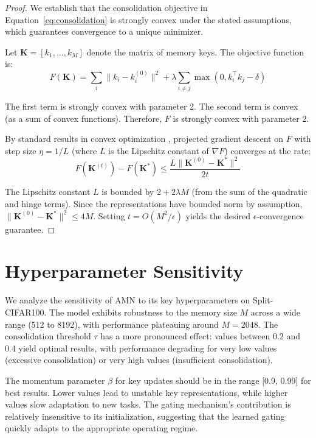 \documentclass[11pt]{article}
\begin{document}
\begin{proof}
We establish that the consolidation objective in Equation~\ref{eq:consolidation} is strongly convex under the stated assumptions, which guarantees convergence to a unique minimizer.

Let $\mathbf{K} = [k_1, \ldots, k_M]$ denote the matrix of memory keys. The objective function is:
\begin{equation}
    F(\mathbf{K}) = \sum_{i} \|k_i - k_i^{(0)}\|^2 + \lambda \sum_{i \neq j} \max(0, k_i^\top k_j - \delta)
\end{equation}

The first term is strongly convex with parameter 2. The second term is convex (as a sum of convex functions). Therefore, $F$ is strongly convex with parameter 2.

By standard results in convex optimization \citep{boyd2004convex}, projected gradient descent on $F$ with step size $\eta = 1/L$ (where $L$ is the Lipschitz constant of $\nabla F$) converges at the rate:
\begin{equation}
    F(\mathbf{K}^{(t)}) - F(\mathbf{K}^*) \leq \frac{L \|\mathbf{K}^{(0)} - \mathbf{K}^*\|^2}{2t}
\end{equation}

The Lipschitz constant $L$ is bounded by $2 + 2\lambda M$ (from the sum of the quadratic and hinge terms). Since the representations have bounded norm by assumption, $\|\mathbf{K}^{(0)} - \mathbf{K}^*\|^2 \leq 4M$. Setting $t = O(M^2/\epsilon)$ yields the desired $\epsilon$-convergence guarantee.
\end{proof}

\section{Hyperparameter Sensitivity}
\label{app:hyperparams}

We analyze the sensitivity of AMN to its key hyperparameters on Split-CIFAR100. The model exhibits robustness to the memory size $M$ across a wide range (512 to 8192), with performance plateauing around $M = 2048$. The consolidation threshold $\tau$ has a more pronounced effect: values between 0.2 and 0.4 yield optimal results, with performance degrading for very low values (excessive consolidation) or very high values (insufficient consolidation).

The momentum parameter $\beta$ for key updates should be in the range [0.9, 0.99] for best results. Lower values lead to unstable key representations, while higher values slow adaptation to new tasks. The gating mechanism's contribution is relatively insensitive to its initialization, suggesting that the learned gating quickly adapts to the appropriate operating regime.
\end{document}
